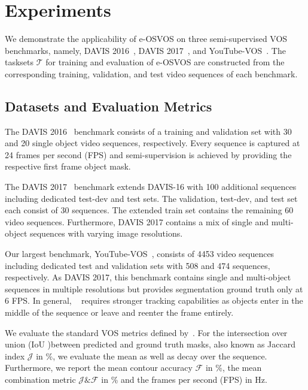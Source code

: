 \documentclass{article}
\begin{document}
 \section{Experiments}

    We demonstrate the applicability of e-OSVOS on three semi-supervised VOS benchmarks, namely, DAVIS 2016~\cite{DAVIS16}, DAVIS 2017~\cite{DAVIS17semi}, and YouTube-VOS~\cite{Xu2018YouTubeVOSAL}.
The tasksets $\mathcal{T}$ for training and evaluation of e-OSVOS are constructed from the corresponding training, validation, and test video sequences of each benchmark.

\subsection{Datasets and Evaluation Metrics}
        The DAVIS 2016~\cite{DAVIS16} benchmark consists of a training and validation set with 30 and 20 single object video sequences, respectively.
Every sequence is captured at 24 frames per second (FPS) and semi-supervision is achieved by providing the respective first frame object mask.


        The DAVIS 2017~\cite{DAVIS17semi} benchmark extends DAVIS-16 with 100 additional sequences including dedicated test-dev and test sets.
The validation, test-dev, and test set each consist of 30 sequences.
The extended train set contains the remaining 60 video sequences.
Furthermore, DAVIS 2017 contains a mix of single and multi-object sequences with varying image resolutions.

        Our largest benchmark, YouTube-VOS~\cite{Xu2018YouTubeVOSAL}, consists of 4453 video sequences including dedicated test and validation sets with 508 and 474 sequences, respectively.
As DAVIS 2017, this benchmark contains single and multi-object sequences in multiple resolutions but provides segmentation ground truth only at 6 FPS.
In general, ~\cite{Xu2018YouTubeVOSAL} requires stronger tracking capabilities as objects enter in the middle of the sequence or leave and reenter the frame entirely.

      \label{sec:eval_metrics}
We evaluate the standard VOS metrics defined by~\cite{DAVIS16}.
For the intersection over union (IoU )between predicted and ground truth masks, also known as Jaccard index $\mathcal{J}$ in \%, we evaluate the mean as well as decay over the sequence.
Furthermore, we report the mean contour accuracy $\mathcal{F}$ in \%, the mean combination metric $\mathcal{J} \& \mathcal{F}$ in \% and the frames per second (FPS) in Hz.
\end{document}
